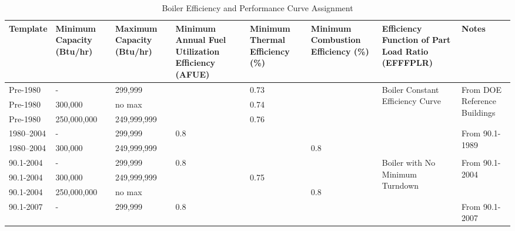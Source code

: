 \begin{table}[h!]
\centering
\scriptsize
\caption{Boiler Efficiency and Performance Curve Assignment}
\label{tab:boiler_eff_table}
\begin{tabular}{|p{0.5in}|p{0.5in}|p{1.7cm}|p{0.5in}|p{0.5in}|p{0.5in}|p{1in}|p{0.5in}|}
\hline
\textbf{Template} &
  \textbf{Minimum   Capacity (Btu/hr)} &
  \textbf{Maximum   Capacity (Btu/hr)} &
  \textbf{Minimum   Annual Fuel Utilization Efficiency (AFUE)} &
  \textbf{Minimum   Thermal Efficiency (\%)} &
  \textbf{Minimum   Combustion Efficiency (\%)} &
  \textbf{Efficiency Function of Part Load Ratio (EFFFPLR)} &
  \textbf{Notes} \\ \hline
Pre-1980 &
  - &
  299,999 &
   &
  0.73 &
   &
  \multirow{5}{*}{\parbox{0.5in}{Boiler Constant Efficiency Curve}} &
  \multirow{3}{*}{\parbox{0.5in}{From DOE Reference Buildings}} \\ \cline{1-6}
Pre-1980  & 300,000     & no max &      & 0.74 &      &                                                     &                                   \\ \cline{1-6}
Pre-1980  & 250,000,000 & 249,999,999 &      & 0.76 &      &                                                     &                                   \\ \cline{1-6} \cline{8-8} 
1980--2004 & -           & 299,999       & 0.8  &      &      &                                                     & \multirow{2}{*}{\parbox{0.5in}{From   90.1-1989}} \\ \cline{1-6}
1980--2004 & 300,000     & 249,999,999   &      &      & 0.8  &                                                     &                                   \\ \hline
90.1-2004           & -           & 299,999       & 0.8  &      &      & \multirow{11}{*}{\parbox{1in}{Boiler with No Minimum Turndown}} & \multirow{3}{*}{\parbox{0.5in}{From   90.1-2004}} \\ \cline{1-6}
90.1-2004           & 300,000     & 249,999,999   &      & 0.75 &      &                                                     &                                   \\ \cline{1-6}
90.1-2004           & 250,000,000 & no max &      &      & 0.8  &                                                     &                                   \\ \cline{1-6} \cline{8-8} 
90.1-2007           & -           & 299,999       & 0.8  &      &      &                                                     & \multirow{3}{*}{\parbox{0.5in}{From   90.1-2007}} \\ \cline{1-6}

\end{tabular}
\end{table}
